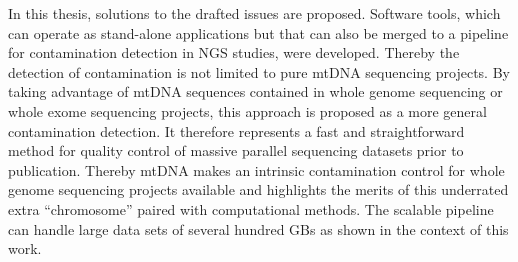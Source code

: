 In this thesis, solutions to the drafted issues are proposed. Software tools, which can operate as stand-alone applications but that can also be merged to a pipeline for contamination detection in NGS studies, were developed. Thereby the detection of contamination is not limited to pure mtDNA sequencing projects. By taking advantage of  mtDNA sequences contained in whole genome sequencing or whole exome sequencing projects, this approach is proposed as a more general contamination detection. It therefore represents a fast and straightforward method for quality control of massive parallel sequencing datasets prior to publication. Thereby mtDNA makes an intrinsic contamination control for whole genome sequencing projects available and highlights the merits of this underrated extra “chromosome” paired with computational methods. The scalable pipeline can handle large data sets of several hundred GBs as shown in the context of this work. 

